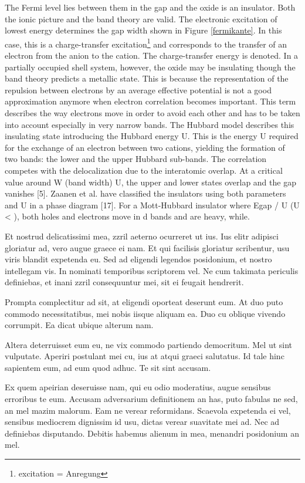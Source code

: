 \documentclass[12pt,oneside,english]{book}
\begin{document}
The Fermi level lies between them in the gap \cite{shirley} and the oxide is an insulator.
Both the ionic picture and the band theory are valid. The electronic excitation
of lowest energy determines the gap width shown in Figure \ref{fermikante}. In
this case, this is a charge-transfer excitation\footnote{excitation = Anregung}
and corresponds to the transfer of an electron
from the anion to the cation. The charge-transfer energy is denoted. In a
partially occupied shell system, however, the oxide may be insulating though
the band theory predicts a metallic state. This is because the representation
of the repulsion between electrons by an average effective potential is not a
good approximation anymore when electron correlation becomes important.
This term describes the way electrons move in order to avoid each other and
has to be taken into account especially in very narrow bands. The Hubbard
model describes this insulating state introducing the Hubbard energy
U. This is the energy U required for the exchange of an electron between
two cations, yielding the formation of two bands: the lower and the upper
Hubbard sub-bands. The correlation competes with the delocalization due
to the interatomic overlap. At a critical value around W (band width) 
U, the upper and lower states overlap and the gap vanishes [5]. Zaanen et
al. have classified the insulators using both parameters  and U in a phase
diagram [17]. For a Mott-Hubbard insulator where Egap / U (U < ), both
holes and electrons move in d bands and are heavy, while.

Et nostrud delicatissimi mea, zzril aeterno ocurreret ut ius. Ius elitr adipisci gloriatur ad, vero augue graece ei nam. Et qui facilisis gloriatur scribentur, usu viris blandit expetenda eu. Sed ad eligendi legendos posidonium, et nostro intellegam vis. In nominati temporibus scriptorem vel. Ne cum takimata periculis definiebas, et inani zzril consequuntur mei, sit ei feugait hendrerit.

Prompta complectitur ad sit, at eligendi oporteat deserunt eum. At duo puto commodo necessitatibus, mei nobis iisque aliquam ea. Duo cu oblique vivendo corrumpit. Ea dicat ubique alterum nam.

Altera deterruisset eum eu, ne vix commodo partiendo democritum. Mel ut sint vulputate. Aperiri postulant mei cu, ius at atqui graeci salutatus. Id tale hinc sapientem eum, ad eum quod adhuc. Te sit sint accusam.

Ex quem apeirian deseruisse nam, qui eu odio moderatius, augue sensibus erroribus te eum. Accusam adversarium definitionem an has, puto fabulas ne sed, an mel mazim malorum. Eam ne verear reformidans. Scaevola expetenda ei vel, sensibus mediocrem dignissim id usu, dictas verear suavitate mei ad. Nec ad definiebas disputando. Debitis habemus alienum in mea, menandri posidonium an mel.
\end{document}
